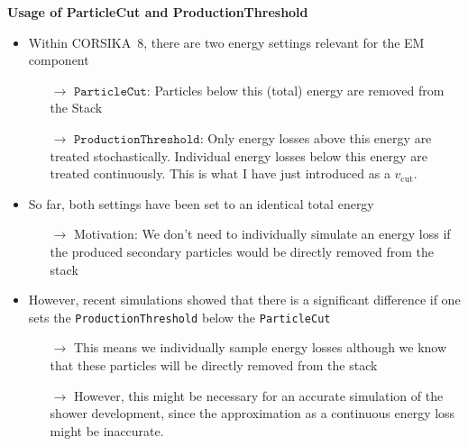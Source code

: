 \documentclass[aspectratio=1610, 9pt]{beamer}
\begin{document}
\begin{frame}

  \textbf{Usage of ParticleCut and ProductionThreshold}

  \begin{itemize}
    \item Within CORSIKA~8, there are two energy settings relevant for the EM component
    \begin{itemize}
      \item[$\rightarrow$] $\texttt{ParticleCut}$: Particles below this (total) energy are removed from the Stack
      \item[$\rightarrow$] $\texttt{ProductionThreshold}$: Only energy losses above this energy are treated stochastically. Individual energy losses below this energy are treated continuously. This is what I have just introduced as a $v_\text{cut}$.
    \end{itemize}
    \item So far, both settings have been set to an identical total energy
    \begin{itemize}
      \item[$\rightarrow$] Motivation: We don't need to individually simulate an energy loss if the produced secondary particles would be directly removed from the stack
    \end{itemize}
    \item However, recent simulations showed that there is a significant difference if one sets the \texttt{ProductionThreshold} below the \texttt{ParticleCut}
    \begin{itemize}
      \item[$\rightarrow$] This means we individually sample energy losses although we know that these particles will be directly removed from the stack
      \item[$\rightarrow$] However, this might be necessary for an accurate simulation of the shower development, since the approximation as a continuous energy loss might be inaccurate.
    \end{itemize}
  \end{itemize}
\end{frame}
\end{document}
